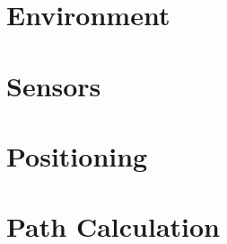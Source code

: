 \documentclass[11pt]{report}
\begin{document}



\tableofcontents

\chapter{Environment} \label{chap:environment}


\chapter{Sensors}\label{chap:sensors}


\chapter{Positioning}\label{chap:positioning}


\chapter{Path Calculation}\label{chap:pathCalculation}


\listoffigures
\listoftables
{}

\end{document}

